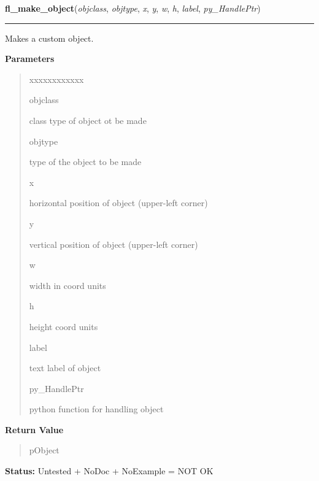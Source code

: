 \hspace{.8\funcindent}\begin{boxedminipage}{\funcwidth}

    \raggedright \textbf{fl\_make\_object}(\textit{objclass}, \textit{objtype}, \textit{x}, \textit{y}, \textit{w}, \textit{h}, \textit{label}, \textit{py\_HandlePtr})

    \vspace{-1.5ex}

    \rule{\textwidth}{0.5\fboxrule}
\setlength{\parskip}{2ex}
    Makes a custom object.

\setlength{\parskip}{1ex}
      \textbf{Parameters}
      \vspace{-1ex}

      \begin{quote}
        \begin{Ventry}{xxxxxxxxxxxx}

          \item[objclass]

          class type of object ot be made

          \item[objtype]

          type of the object to be made

          \item[x]

          horizontal position of object (upper-left corner)

          \item[y]

          vertical position of object (upper-left corner)

          \item[w]

          width in coord units

          \item[h]

          height coord units

          \item[label]

          text label of object

          \item[py\_HandlePtr]

          python function for handling object

        \end{Ventry}

      \end{quote}

      \textbf{Return Value}
    \vspace{-1ex}

      \begin{quote}
      pObject

      \end{quote}

\textbf{Status:} Untested + NoDoc + NoExample = NOT OK



    \end{boxedminipage}

